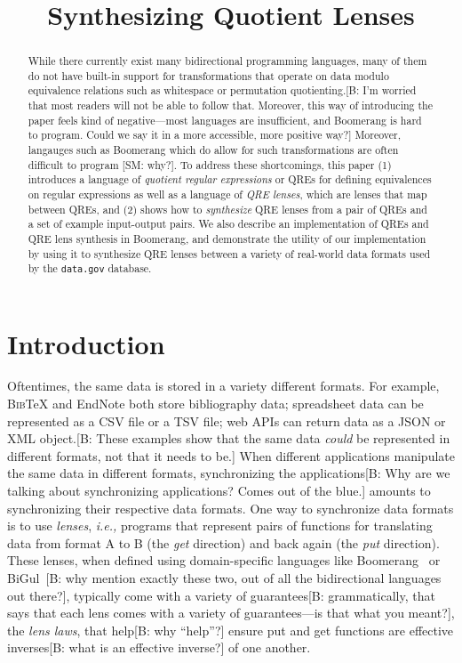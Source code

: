 \documentclass[acmsmall,review,anonymous]{acmart}
\newcommand{\FINISH}[3]{\ifdraft\textcolor{#1}{[#2: #3]}\fi}
\newcommand{\bcp}[1]{\FINISH{dkred}{B}{#1}}
\newcommand{\sam}[1]{\FINISH{dkpurple}{SM}{#1}}
\newcommand{\bibtex}{\textsc{Bib}\TeX{}}
\begin{document}
\title{Synthesizing Quotient Lenses}
\begin{abstract}
While there currently exist many bidirectional programming languages, many of
them do not have built-in support for transformations that operate on data
modulo equivalence relations such as whitespace or permutation
quotienting.\bcp{I'm worried that most readers will not be able to follow
  that.  Moreover, this way of introducing the paper feels kind of
  negative---most languages are insufficient, and Boomerang is hard to
  program.  Could we say it in a more accessible, more positive way?}
Moreover, langauges such as Boomerang which do allow for such transformations
are often difficult to program \sam{why?}. To address these shortcomings, this
paper (1) introduces a language of {\em quotient regular expressions} or QREs
for defining equivalences on regular expressions as well as a language of {\em
QRE lenses}, which are lenses that map between QREs, and (2) shows how to {\em
synthesize} QRE lenses from a pair of QREs and a set of example input-output
pairs. We also describe an implementation of QREs and QRE lens synthesis in
Boomerang, and demonstrate the utility of our implementation by using it to
synthesize QRE lenses between a variety of real-world data formats used by
the {\tt data.gov} database. 
\end{abstract}

\maketitle

\section{Introduction}

Oftentimes, the same data is stored in a variety different formats. For
example, \bibtex{} and EndNote both store bibliography data; spreadsheet data
can be represented as a CSV file or a TSV file; web APIs can return data as a
JSON or
XML object.\bcp{These examples show that the same data {\em could} be
  represented in different formats, not that it needs to be.} When different applications manipulate the same data in different formats,
synchronizing the applications\bcp{Why are we talking about synchronizing
  applications?  Comes out of the blue.} amounts to synchronizing their
respective data
formats. One way to synchronize data formats is to use \emph{lenses}, \emph{i.e.,} programs that represent pairs of functions for translating data from
format A to B (the \emph{get} direction) and back again (the \emph{put}
direction).  These lenses, when defined using domain-specific
languages like Boomerang~\cite{boomerang} or
BiGul~\cite{ko2016bigul}\bcp{why mention exactly these two, out of all the
  bidirectional languages out there?}, typically come with a variety of
guarantees\bcp{grammatically, that says that each lens comes with a variety
  of guarantees---is that what you meant?},
the \emph{lens laws}, that help\bcp{why ``help''?} ensure put and get
functions are effective 
inverses\bcp{what is an effective inverse?} of one another.
\end{document}
